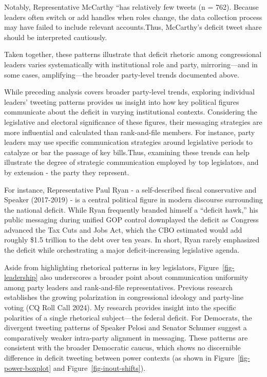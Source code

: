 \documentclass[
]{article}
\begin{document}
Notably, Representative McCarthy ``has relatively few tweets (n = 762).
Because leaders often switch or add handles when roles change, the data
collection process may have failed to include relevant accounts.Thus,
McCarthy's deficit tweet share should be interpreted cautiously.

Taken together, these patterns illustrate that deficit rhetoric among
congressional leaders varies systematically with institutional role and
party, mirroring---and in some cases, amplifying---the broader
party-level trends documented above.

While preceding analysis covers broader party-level trends, exploring
individual leaders' tweeting patterns provides us insight into how key
political figures communicate about the deficit in varying institutional
contexts. Considering the legislative and electoral significance of
these figures, their messaging strategies are more influential and
calculated than rank-and-file members. For instance, party leaders may
use specific communication strategies around legislative periods to
catalyze or bar the passage of key bills.Thus, examining these trends
can help illustrate the degree of strategic communication employed by
top legislators, and by extension - the party they represent.

For instance, Representative Paul Ryan - a self-described fiscal
conservative and Speaker (2017-2019) - is a central political figure in
modern discourse surrounding the national deficit. While Ryan frequently
branded himself a ``deficit hawk,'' his public messaging during unified
GOP control downplayed the deficit as Congress advanced the Tax Cuts and
Jobs Act, which the CBO estimated would add roughly \$1.5 trillion to
the debt over ten years. In short, Ryan rarely emphasized the deficit
while orchestrating a major deficit-increasing legislative agenda.

Aside from highlighting rhetorical patterns in key legislators,
Figure~\ref{fig-leadership} also underscores a broader point about
communication uniformity among party leaders and rank-and-file
representatives. Previous research establishes the growing polarization
in congressional ideology and party-line voting (CQ Roll Call 2024). My
research provides insight into the specific polarities of a single
rhetorical subject---the federal deficit. For Democrats, the divergent
tweeting patterns of Speaker Pelosi and Senator Schumer suggest a
comparatively weaker intra-party alignment in messaging. These patterns
are consistent with the broader Democratic caucus, which shows no
discernible difference in deficit tweeting between power contexts (as
shown in Figure~\ref{fig-power-boxplot} and
Figure~\ref{fig-inout-shifts}).
\end{document}
